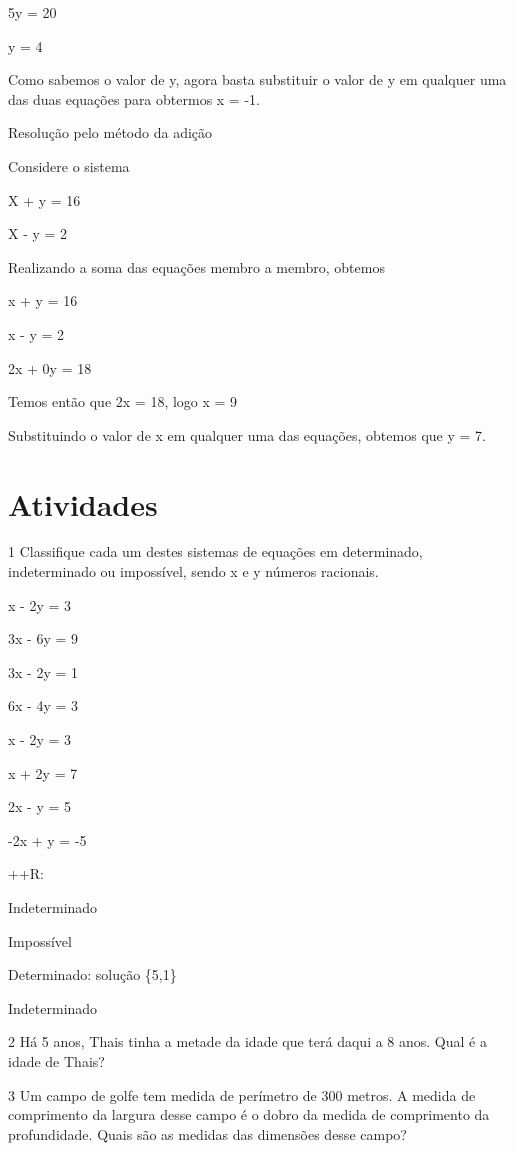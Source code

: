 {5y = 20

y = 4

Como sabemos o valor de y, agora basta substituir o valor de y em
qualquer uma das duas equações para obtermos x = -1.

Resolução pelo método da adição

Considere o sistema

X + y = 16

X - y = 2

Realizando a soma das equações membro a membro, obtemos

x + y = 16

x - y = 2

2x + 0y = 18

Temos então que 2x = 18, logo x = 9

Substituindo o valor de x em qualquer uma das equações, obtemos que y =
7.

\section{Atividades}

\num{1} Classifique cada um destes sistemas de equações em determinado,
indeterminado ou impossível, sendo x e y números racionais.
\item x - 2y = 3

3x - 6y = 9
\item 3x - 2y = 1

6x - 4y = 3
\item x - 2y = 3

x + 2y = 7
\item 2x - y = 5

-2x + y = -5

++R:
\item Indeterminado
\item Impossível
\item Determinado: solução \{5,1\}
\item Indeterminado

\num{2} Há 5 anos, Thais tinha a metade da idade que terá daqui a 8 anos.
Qual é a idade de Thais?


\num{3} Um campo de golfe tem medida de perímetro de 300 metros. A medida de
comprimento da largura desse campo é o dobro da medida de comprimento da
profundidade. Quais são as medidas das dimensões desse campo?

}
